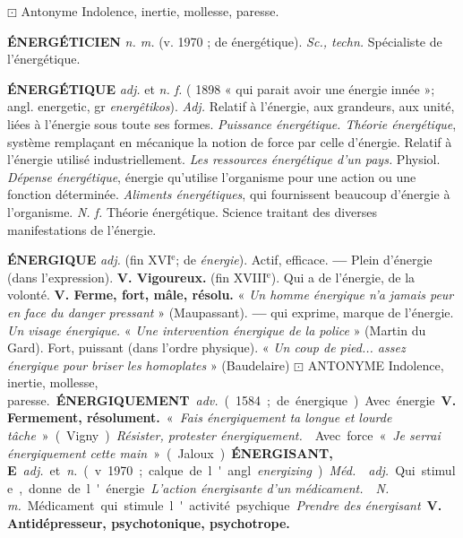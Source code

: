 $\boxdot$ {\sc Antonyme} \si{Indolence, inertie, mollesse, paresse.}

\vspace{0.24cm}
{\footnotesize 
{\bf ÉNERGÉTICIEN} {\it n. m.} (v. 1970 ; de énergétique). {\it Sc., techn.} Spécialiste de l'énergétique.

{\bf ÉNERGÉTIQUE} {\it adj.} et {\it n. f.} ( 1898 « qui parait avoir une énergie innée »; angl. energetic, gr {\it energêtikos}).  {\it Adj.} Relatif à l'énergie, aux grandeurs, aux unité, liées à l'énergie sous toute ses formes. {\it Puissance énergétique. Théorie énergétique}, système remplaçant en mécanique la notion de force par celle d'énergie. \lb Relatif à l'énergie utilisé industriellement. {\it Les ressources énergétique d'un pays.} \lb Physiol. {\it Dépense énergétique}, énergie qu'utilise l'organisme pour une action ou une fonction déterminée. {\it Aliments énergétiques}, qui fournissent beaucoup d'énergie à l'organisme.  {\it N. f.} Théorie énergétique. Science traitant des diverses manifestations de l'énergie.

{\bf ÉNERGIQUE} {\it adj.} (fin {\footnotesize XVI}$^\text{e}$; de {\it énergie}).  Actif, efficace.  {\bf —} Plein d'énergie (dans l'expression). {\bf V. Vigoureux.} (fin {\footnotesize XVIII}$^\text{e}$). Qui a de l'énergie, de la volonté. {\bf V. Ferme, fort, mâle, résolu.} « {\it Un homme énergique n'a jamais peur en face du danger pressant} » ({\sc Maupassant}). {\bf —} qui exprime, marque de l'énergie. {\it Un visage énergique.} « {\it Une intervention énergique de la police} » ({\sc Martin du Gard}). \lb Fort, puissant (dans l'ordre physique). « {\it Un coup de pied... assez énergique pour briser les homoplates} » ({\sc Baudelaire}) $\boxdot$ {\sc ANTONYME} \si{Indolence, inertie, mollesse, paresse.}

{\bf ÉNERGIQUEMENT} {\it adv.} (1584; de énergique) Avec énergie. {\bf V. Fermement, résolument.} « {\it Fais énergiquement ta longue et lourde tâche} » ({\sc Vigny}). {\it Résister, protester énergiquement.} \lb Avec force « {\it Je serrai énergiquement cette main} » ({\sc Jaloux}).

{\bf ÉNERGISANT, E} {\it adj.} et {\it n.} (v. 1970 ; calque de l'angl. {\it energizing}). {\it Méd.}  {\it adj.} Qui stimule, donne de l'énergie. {\it L'action énergisante d'un médicament.}  {\it N. m.} Médicament qui stimule l'activité psychique. {\it Prendre des énergisant}. {\bf V. Antidépresseur, psychotonique, psychotrope.}
}
\vspace{0.31cm}

